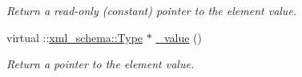 \begin{DoxyCompactItemize}
\begin{DoxyCompactList}\small\item\em Return a read-\/only (constant) pointer to the element value. \item\end{DoxyCompactList}\item 
virtual ::\hyperlink{namespacexml__schema_ad34e8fd175bf4f9fece6c670b01aa239}{xml\_\-schema::Type} $\ast$ \hyperlink{classopenstack_1_1xml_1_1ServerCapacityUnavailable_a3ba3d1e58e8d0c87609e25b89ac2a55c}{\_\-value} ()
\begin{DoxyCompactList}\small\item\em Return a pointer to the element value. \item\end{DoxyCompactList}\end{DoxyCompactItemize}
